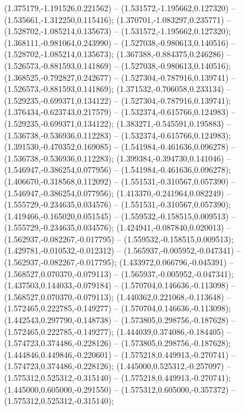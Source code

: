  (1.375179,-1.191526,0.221562) -- (1.531572,-1.195662,0.127320) -- (1.535661,-1.312250,0.115416);
 (1.370701,-1.083297,0.235771) -- (1.528702,-1.085214,0.135673) -- (1.531572,-1.195662,0.127320);
 (1.368111,-0.981064,0.243990) -- (1.527038,-0.980613,0.140516) -- (1.528702,-1.085214,0.135673);
 (1.367388,-0.884375,0.246286) -- (1.526573,-0.881593,0.141869) -- (1.527038,-0.980613,0.140516);
 (1.368525,-0.792827,0.242677) -- (1.527304,-0.787916,0.139741) -- (1.526573,-0.881593,0.141869);
 (1.371532,-0.706058,0.233134) -- (1.529235,-0.699371,0.134122) -- (1.527304,-0.787916,0.139741);
 (1.376434,-0.623743,0.217579) -- (1.532374,-0.615766,0.124983) -- (1.529235,-0.699371,0.134122);
 (1.383271,-0.545591,0.195883) -- (1.536738,-0.536936,0.112283) -- (1.532374,-0.615766,0.124983);
 (1.391530,-0.470352,0.169085) -- (1.541984,-0.461636,0.096278) -- (1.536738,-0.536936,0.112283);
 (1.399384,-0.394730,0.141046) -- (1.546947,-0.386254,0.077956) -- (1.541984,-0.461636,0.096278);
 (1.406670,-0.318568,0.112092) -- (1.551531,-0.310567,0.057390) -- (1.546947,-0.386254,0.077956);
 (1.413370,-0.241964,0.082249) -- (1.555729,-0.234635,0.034576) -- (1.551531,-0.310567,0.057390);
 (1.419466,-0.165020,0.051545) -- (1.559532,-0.158515,0.009513) -- (1.555729,-0.234635,0.034576);
 (1.424941,-0.087840,0.020013) -- (1.562937,-0.082267,-0.017795) -- (1.559532,-0.158515,0.009513);
 (1.429781,-0.010532,-0.012312) -- (1.565937,-0.005952,-0.047341) -- (1.562937,-0.082267,-0.017795);
 (1.433972,0.066796,-0.045391) -- (1.568527,0.070370,-0.079113) -- (1.565937,-0.005952,-0.047341);
 (1.437503,0.144033,-0.079184) -- (1.570704,0.146636,-0.113098) -- (1.568527,0.070370,-0.079113);
 (1.440362,0.221068,-0.113648) -- (1.572465,0.222785,-0.149277) -- (1.570704,0.146636,-0.113098);
 (1.442543,0.297790,-0.148738) -- (1.573805,0.298756,-0.187628) -- (1.572465,0.222785,-0.149277);
 (1.444039,0.374086,-0.184405) -- (1.574723,0.374486,-0.228126) -- (1.573805,0.298756,-0.187628);
 (1.444846,0.449846,-0.220601) -- (1.575218,0.449913,-0.270741) -- (1.574723,0.374486,-0.228126);
 (1.445000,0.525312,-0.257097) -- (1.575312,0.525312,-0.315140) -- (1.575218,0.449913,-0.270741);
 (1.445000,0.605000,-0.291550) -- (1.575312,0.605000,-0.357372) -- (1.575312,0.525312,-0.315140);
